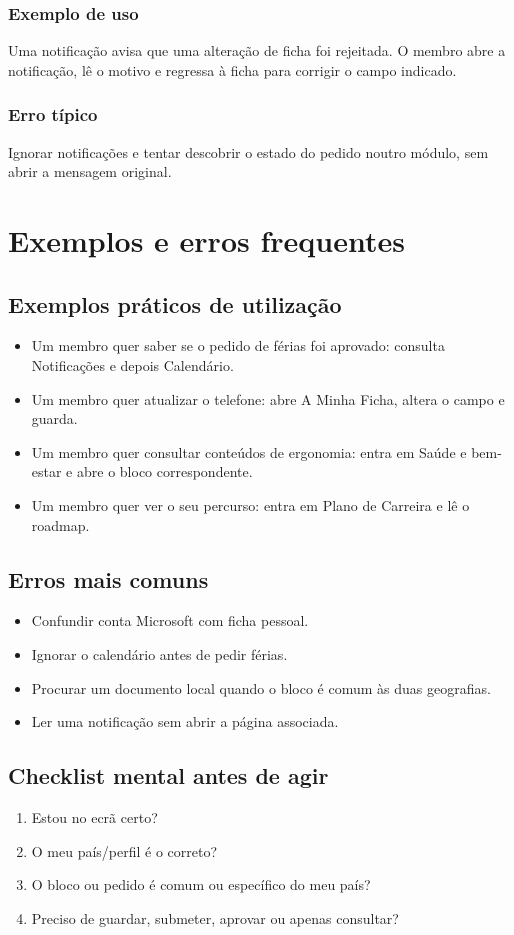 \subsection{Exemplo de uso}
Uma notificação avisa que uma alteração de ficha foi rejeitada. O membro abre a notificação, lê o motivo e regressa à ficha para corrigir o campo indicado.

\subsection{Erro típico}
Ignorar notificações e tentar descobrir o estado do pedido noutro módulo, sem abrir a mensagem original.

\chapter{Exemplos e erros frequentes}
\section{Exemplos práticos de utilização}
\begin{itemize}
  \item Um membro quer saber se o pedido de férias foi aprovado: consulta Notificações e depois Calendário.
  \item Um membro quer atualizar o telefone: abre A Minha Ficha, altera o campo e guarda.
  \item Um membro quer consultar conteúdos de ergonomia: entra em Saúde e bem-estar e abre o bloco correspondente.
  \item Um membro quer ver o seu percurso: entra em Plano de Carreira e lê o roadmap.
\end{itemize}

\section{Erros mais comuns}
\begin{itemize}
  \item Confundir conta Microsoft com ficha pessoal.
  \item Ignorar o calendário antes de pedir férias.
  \item Procurar um documento local quando o bloco é comum às duas geografias.
  \item Ler uma notificação sem abrir a página associada.
\end{itemize}

\section{Checklist mental antes de agir}
\begin{enumerate}
  \item Estou no ecrã certo?
  \item O meu país/perfil é o correto?
  \item O bloco ou pedido é comum ou específico do meu país?
  \item Preciso de guardar, submeter, aprovar ou apenas consultar?
\end{enumerate}

